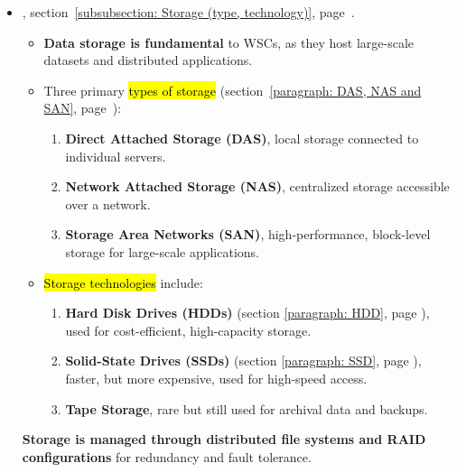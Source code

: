 \begin{itemize}
	\item {}, section~\ref{subsubsection: Storage (type, technology)}, page~\pageref{subsubsection: Storage (type, technology)}.
    \begin{itemize}
        \item \textbf{Data storage is fundamental} to WSCs, as they host large-scale datasets and distributed applications.
        \item Three primary \hl{types of storage} (section~\ref{paragraph: DAS, NAS and SAN}, page~\pageref{paragraph: DAS, NAS and SAN}):
        \begin{enumerate}
        	\item \textbf{Direct Attached Storage (DAS)}, local storage connected to individual servers.
        	\item \textbf{Network Attached Storage (NAS)}, centralized storage accessible over a network.
        	\item \textbf{Storage Area Networks (SAN)}, high-performance, block-level storage for large-scale applications.
        \end{enumerate}
        \item \hl{Storage technologies} include:
        \begin{enumerate}
        	\item \textbf{Hard Disk Drives (HDDs)} (section \ref{paragraph: HDD}, page \pageref{paragraph: HDD}), used for cost-efficient, high-capacity storage.
        	\item \textbf{Solid-State Drives (SSDs)} (section \ref{paragraph: SSD}, page \pageref{paragraph: SSD}), faster, but more expensive, used for high-speed access.
        	\item \textbf{Tape Storage}, rare but still used for archival data and backups.
        \end{enumerate}
    \end{itemize}
    \textbf{Storage is managed through distributed file systems and RAID configurations} for redundancy and fault tolerance.
	

\end{itemize}

